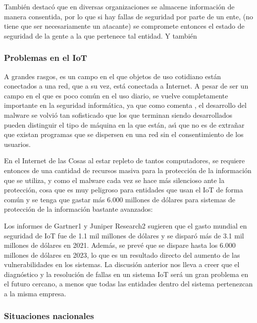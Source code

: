 Tambi\'en \textcite{Banja2020} destac\'o que en diversas organizaciones se almacene
informaci\'on de manera consentida, por lo que si hay fallas de seguridad por
parte de un ente, (no tiene que ser necesariamente un atacante) se compromete
entonces el estado de seguridad de la gente a la que pertenece tal entidad. Y
tambi\'en

\subsubsection{Problemas en el IoT}

A grandes rasgos, es un campo en el que objetos de uso cotidiano est\'an
conectados a una red, que a su vez, est\'a conectada a Internet. A pesar de ser un
campo en el que es poco com\'un en el uso diario, se vuelve completamente
importante en la seguridad inform\'atica, ya que como comenta
\textcite{Aboaoja2022}, el desarrollo del malware se volvi\'o tan sofisticado que
los que terminan siendo desarrollados pueden distinguir el tipo de m\'aquina en
la que est\'an, as\'{\i} que no es de extra\~nar que existan programas que se dispersen
en una red sin el consentimiento de los usuarios.

En el Internet de las Cosas al estar repleto de tantos computadores, se requiere
entonces de una cantidad de recursos masiva para la protecci\'on de la informaci\'on
que se utiliza, y como el malware cada vez se hace m\'as silencioso ante la
protecci\'on, cosa que es muy peligroso para entidades que usan el IoT de forma
com\'un y se tenga que gastar m\'as 6.000 millones de d\'olares para sistemas de
protecci\'on de la informaci\'on bastante avanzados:

\begin{displayquote}
	Los informes de Gartner1 y Juniper Research2 sugieren que el gasto mundial en
	seguridad de IoT fue de 1.1 mil millones de d\'olares y se dispar\'o m\'as de 3.1
	mil millones de d\'olares en 2021. Adem\'as, se prev\'e que se dispare hasta los
	6.000 millones de d\'olares en 2023, lo que es un resultado directo del aumento
	de las vulnerabilidades en los sistemas. La discusi\'on anterior nos lleva a
	creer que el diagn\'ostico y la resoluci\'on de fallas en un sistema IoT ser\'a un
	gran problema en el futuro cercano, a menos que todas las entidades dentro del
	sistema pertenezcan a la misma empresa. \parencite{Singh2022}
\end{displayquote}

\subsubsection{Situaciones nacionales}


